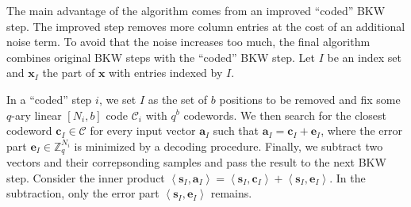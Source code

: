 The main advantage of the algorithm comes from an improved ``coded'' BKW step. The improved step removes more column entries at the cost of an additional noise term. To avoid that the noise increases too much, the final algorithm combines original BKW steps with the ``coded'' BKW step. Let $I$ be an index set and $\mathbf{x}_I$ the part of $\mathbf{x}$ with entries indexed by $I$.

In a ``coded'' step $i$, we set $I$ as the set of $b$ positions to be removed and fix some $q$-ary linear $\left[N_i, b\right]$ code $\mathcal{C}_i$ with $q^b$ codewords. We then search for the closest codeword $\mathbf{c}_I \in \mathcal{C}$ for every input vector $\mathbf{a}_I$ such that $\mathbf{a}_I = \mathbf{c}_I + \mathbf{e}_I$, where the error part $\mathbf{e}_I \in \mathbb{Z}_q^{N_i}$ is minimized by a decoding procedure. Finally, we subtract two vectors and their correpsonding samples and pass the result to the next BKW step. Consider the inner product $\left\langle \mathbf{s}_{I}, \mathbf{a}_{I} \right\rangle = \left\langle \mathbf{s}_{I}, \mathbf{c}_{I} \right\rangle + \left\langle \mathbf{s}_{I}, \mathbf{e}_{I} \right\rangle$. In the subtraction, only the error part $\left\langle \mathbf{s}_{I}, \mathbf{e}_{I} \right\rangle$ remains. %







